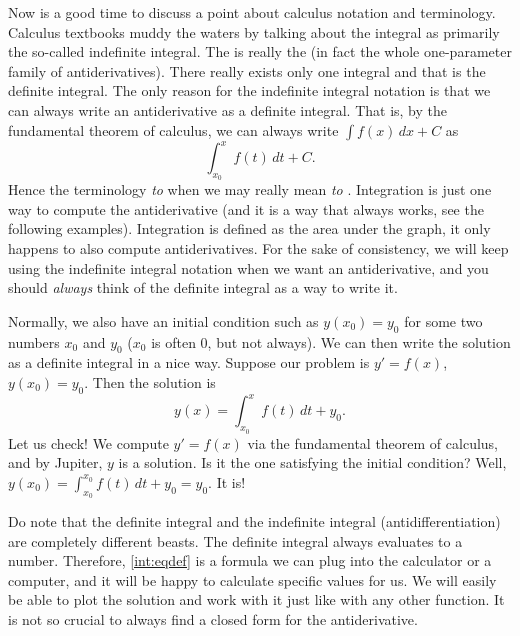 Now is a good time to discuss a point about
calculus notation and terminology.  Calculus
textbooks muddy the waters by talking about the integral as primarily the
so-called indefinite integral.  The 
is really the \emph{} 
(in fact the whole one-parameter family
of antiderivatives).  There really exists only one integral and that
is the definite integral.
The only reason for the indefinite integral notation is that we can always
write an antiderivative as a definite integral.  That is, by the fundamental
theorem of calculus, we can always write
$\int f(x) \,dx + C$ as
\begin{equation*}
\int_{x_0}^x f(t) \,dt + C .
\end{equation*}
Hence the terminology \emph{to } when we may really mean
\emph{to }.
Integration is just one way to compute the
antiderivative (and it is a way that always works, see the following
examples).  Integration is defined as the area under the graph, it
only happens to also compute antiderivatives.
For the sake of consistency, we will keep using the
indefinite integral notation when we want an antiderivative,
and you should \emph{always} think of the definite integral
as a way to write it.

Normally, we also have an initial condition such as $y(x_0) = y_0$
for some two numbers $x_0$ and $y_0$ ($x_0$ is often 0, but not always).
We can then write the solution as a definite integral in a nice way.
Suppose our problem is $y' = f(x)$, $y(x_0) = y_0$.  Then the solution is
\begin{equation} \label{int:eqdef}
y(x) = \int_{x_0}^x f(t) \,dt + y_0 .
\end{equation}
Let us check!
We compute
$y' = f(x)$ via the fundamental theorem of calculus, and by Jupiter, $y$ is a
solution.  Is it the one satisfying the initial condition?  Well,
$y(x_0) = \int_{x_0}^{x_0} f(t)\,dt + y_0 = y_0$.  It is!

Do note that the definite integral and the indefinite integral
(antidifferentiation) are completely different beasts.  The definite integral
always evaluates to a number.  Therefore, \eqref{int:eqdef} is a formula we
can plug into the calculator or a computer, and it will be happy to calculate
specific values for us.  We will easily be able to plot the
solution and work with it just like with any other function.
It is not so crucial to always find a
closed form for the antiderivative.

